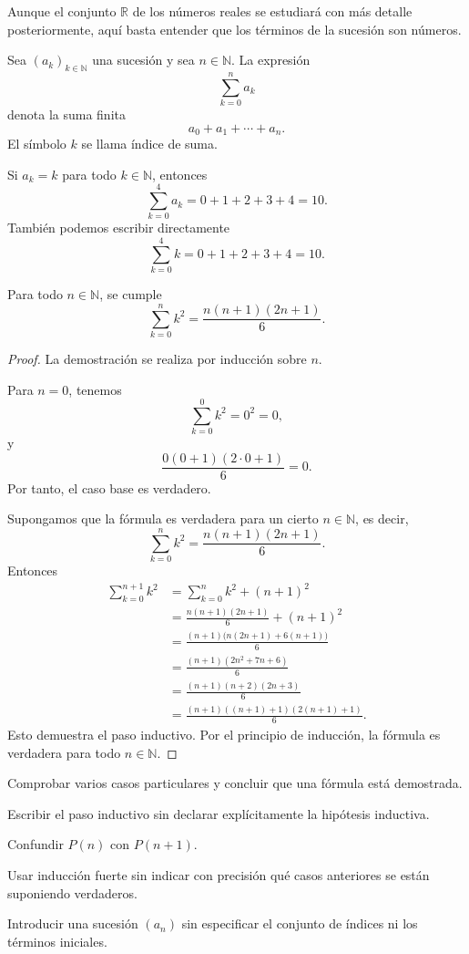 Aunque el conjunto \(\mathbb{R}\) de los números reales se estudiará con más detalle posteriormente, aquí basta entender que los términos de la sucesión son números.

\begin{definicion}
Sea \((a_k)_{k\in\mathbb{N}}\) una sucesión y sea \(n\in\mathbb{N}\). La expresión
\[
  \sum_{k=0}^{n} a_k
\]
denota la suma finita
\[
  a_0+a_1+\cdots+a_n.
\]
El símbolo \(k\) se llama índice de suma.
\end{definicion}

\begin{ejemplo}
Si \(a_k=k\) para todo \(k\in\mathbb{N}\), entonces
\[
  \sum_{k=0}^{4} a_k=0+1+2+3+4=10.
\]
También podemos escribir directamente
\[
  \sum_{k=0}^{4} k=0+1+2+3+4=10.
\]
\end{ejemplo}

\begin{proposicion}
Para todo \(n\in\mathbb{N}\), se cumple
\[
  \sum_{k=0}^{n} k^2=\frac{n(n+1)(2n+1)}{6}.
\]
\end{proposicion}

\begin{proof}
La demostración se realiza por inducción sobre \(n\).

Para \(n=0\), tenemos
\[
  \sum_{k=0}^{0} k^2=0^2=0,
\]
y
\[
  \frac{0(0+1)(2\cdot 0+1)}{6}=0.
\]
Por tanto, el caso base es verdadero.

Supongamos que la fórmula es verdadera para un cierto \(n\in\mathbb{N}\), es decir,
\[
  \sum_{k=0}^{n} k^2=\frac{n(n+1)(2n+1)}{6}.
\]
Entonces
\[
\begin{aligned}
  \sum_{k=0}^{n+1} k^2
  &= \sum_{k=0}^{n} k^2+(n+1)^2 \\
  &= \frac{n(n+1)(2n+1)}{6}+(n+1)^2 \\
  &= \frac{(n+1)\bigl(n(2n+1)+6(n+1)\bigr)}{6} \\
  &= \frac{(n+1)(2n^2+7n+6)}{6} \\
  &= \frac{(n+1)(n+2)(2n+3)}{6} \\
  &= \frac{(n+1)((n+1)+1)(2(n+1)+1)}{6}.
\end{aligned}
\]
Esto demuestra el paso inductivo. Por el principio de inducción, la fórmula es verdadera para todo \(n\in\mathbb{N}\).
\end{proof}

\begin{erroresfrecuentes}
  \item Comprobar varios casos particulares y concluir que una fórmula está demostrada.
  \item Escribir el paso inductivo sin declarar explícitamente la hipótesis inductiva.
  \item Confundir \(P(n)\) con \(P(n+1)\).
  \item Usar inducción fuerte sin indicar con precisión qué casos anteriores se están suponiendo verdaderos.
  \item Introducir una sucesión \((a_n)\) sin especificar el conjunto de índices ni los términos iniciales.
\end{erroresfrecuentes}

